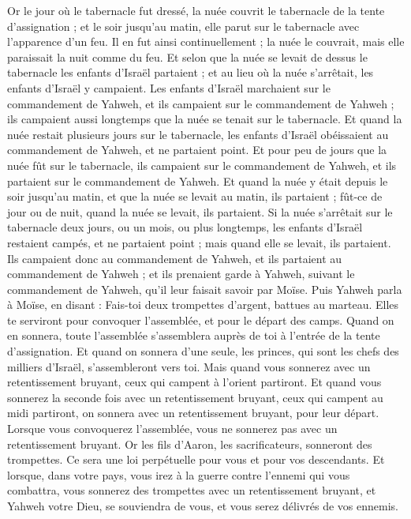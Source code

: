 \begin{multicols}{2}
Or le jour où le tabernacle fut dressé, la nuée couvrit le tabernacle de la tente d'assignation ; et le soir jusqu'au matin, elle parut sur le tabernacle avec l'apparence d'un feu.
Il en fut ainsi continuellement ; la nuée le couvrait, mais elle paraissait la nuit comme du feu.
Et selon que la nuée se levait de dessus le tabernacle les enfants d'Israël partaient ; et au lieu où la nuée s'arrêtait, les enfants d'Israël y campaient.
Les enfants d'Israël marchaient sur le commandement de Yahweh, et ils campaient sur le commandement de Yahweh ; ils campaient aussi longtemps que la nuée se tenait sur le tabernacle.
Et quand la nuée restait plusieurs jours sur le tabernacle, les enfants d'Israël obéissaient au commandement de Yahweh, et ne partaient point.
Et pour peu de jours que la nuée fût sur le tabernacle, ils campaient sur le commandement de Yahweh, et ils partaient sur le commandement de Yahweh.
Et quand la nuée y était depuis le soir jusqu'au matin, et que la nuée se levait au matin, ils partaient ; fût-ce de jour ou de nuit, quand la nuée se levait, ils partaient.
Si la nuée s'arrêtait sur le tabernacle deux jours, ou un mois, ou plus longtemps, les enfants d'Israël restaient campés, et ne partaient point ; mais quand elle se levait, ils partaient.
Ils campaient donc au commandement de Yahweh, et ils partaient au commandement de Yahweh ; et ils prenaient garde à Yahweh, suivant le commandement de Yahweh, qu'il leur faisait savoir par Moïse.
\VerseOne{}Puis Yahweh parla à Moïse, en disant :
Fais-toi deux trompettes d'argent, battues au marteau. Elles te serviront pour convoquer l'assemblée, et pour le départ des camps.
Quand on en sonnera, toute l'assemblée s'assemblera auprès de toi à l'entrée de la tente d'assignation.
Et quand on sonnera d'une seule, les princes, qui sont les chefs des milliers d'Israël, s'assembleront vers toi.
Mais quand vous sonnerez avec un retentissement bruyant, ceux qui campent à l'orient partiront.
Et quand vous sonnerez la seconde fois avec un retentissement bruyant, ceux qui campent au midi partiront, on sonnera avec un retentissement bruyant, pour leur départ.
Lorsque vous convoquerez l'assemblée, vous ne sonnerez pas avec un retentissement bruyant.
Or les fils d'Aaron, les sacrificateurs, sonneront des trompettes. Ce sera une loi perpétuelle pour vous et pour vos descendants.
Et lorsque, dans votre pays, vous irez à la guerre contre l'ennemi qui vous combattra, vous sonnerez des trompettes avec un retentissement bruyant, et Yahweh votre Dieu, se souviendra de vous, et vous serez délivrés de vos ennemis.

\end{multicols}
